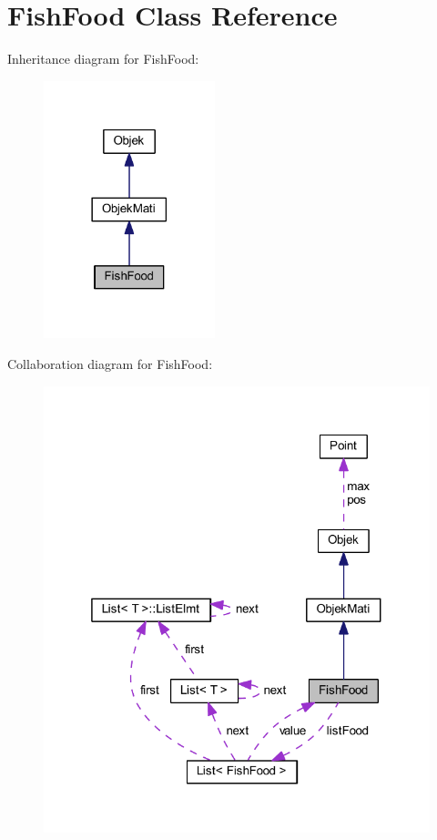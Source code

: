 \hypertarget{class_fish_food}{}\section{Fish\+Food Class Reference}
\label{class_fish_food}


Inheritance diagram for Fish\+Food\+:\nopagebreak
\begin{figure}[H]
\begin{center}
\leavevmode
\includegraphics[width=141pt]{class_fish_food__inherit__graph}
\end{center}
\end{figure}


Collaboration diagram for Fish\+Food\+:\nopagebreak
\begin{figure}[H]
\begin{center}
\leavevmode
\includegraphics[width=319pt]{class_fish_food__coll__graph}
\end{center}
\end{figure}
